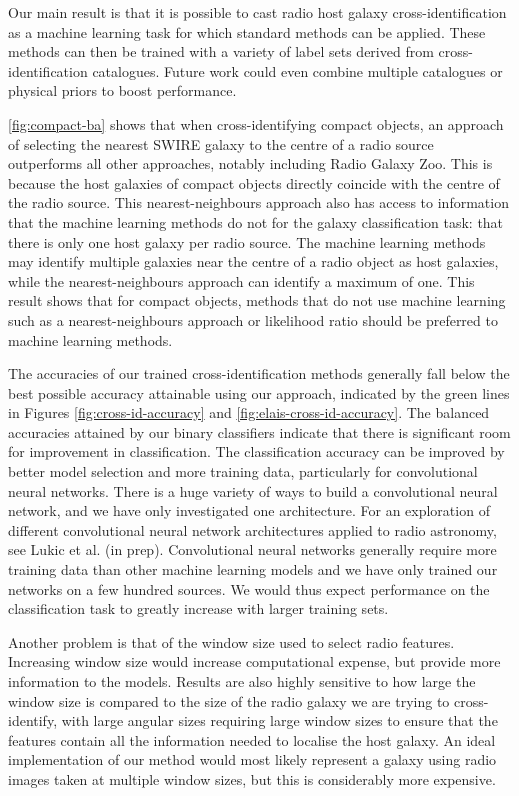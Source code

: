 \documentclass[fleqn,usenatbib,usedcolumn]{mnras}
\begin{document}
  Our main result is that it is possible to cast radio host galaxy
  cross-identification as a machine learning task for which standard methods
  can be applied. These methods can then be trained with a variety of label
  sets derived from cross-identification catalogues. Future work could even
  combine multiple catalogues or physical priors to boost performance.

  \autoref{fig:compact-ba} shows that when cross-identifying compact objects,
  an approach of selecting the nearest SWIRE galaxy to the centre of a radio
  source outperforms all other approaches, notably including Radio Galaxy Zoo.
  This is because the host galaxies of compact objects directly coincide with
  the centre of the radio source. This nearest-neighbours approach also has
  access to information that the machine learning methods do not for the
  galaxy classification task: that there is only one host galaxy per radio
  source. The machine learning methods may identify multiple galaxies near the
  centre of a radio object as host galaxies, while the nearest-neighbours
  approach can identify a maximum of one. This result shows that for compact
  objects, methods that do not use machine learning such as a
  nearest-neighbours approach or likelihood ratio \citep{weston17} should be
  preferred to machine learning methods.

  The accuracies of our trained cross-identification methods generally fall
  below the best possible accuracy attainable using our approach, indicated
  by the green lines in Figures \ref{fig:cross-id-accuracy} and
  \ref{fig:elais-cross-id-accuracy}. The balanced accuracies attained by our
  binary classifiers indicate that there is significant room for improvement
  in classification. The classification accuracy can be improved by better
  model selection and more training data, particularly for convolutional
  neural networks. There is a huge variety of ways to build a convolutional
  neural network, and we have only investigated one architecture. For an
  exploration of different convolutional neural network architectures
  applied to radio astronomy, see Lukic et al. (in prep). Convolutional
  neural networks generally require more training data than other machine
  learning models and we have only trained our networks on a few hundred
  sources. We would thus expect performance on the classification task to
  greatly increase with larger training sets.

  Another problem is that of the window size used to select radio features.
  Increasing window size would increase computational expense, but provide
  more information to the models. Results are also highly sensitive to how
  large the window size is compared to the size of the radio galaxy we are
  trying to cross-identify, with large angular sizes requiring large window
  sizes to ensure that the features contain all the information needed to
  localise the host galaxy. An ideal implementation of our method would most
  likely represent a galaxy using radio images taken at multiple window
  sizes, but this is considerably more expensive.
\end{document}
